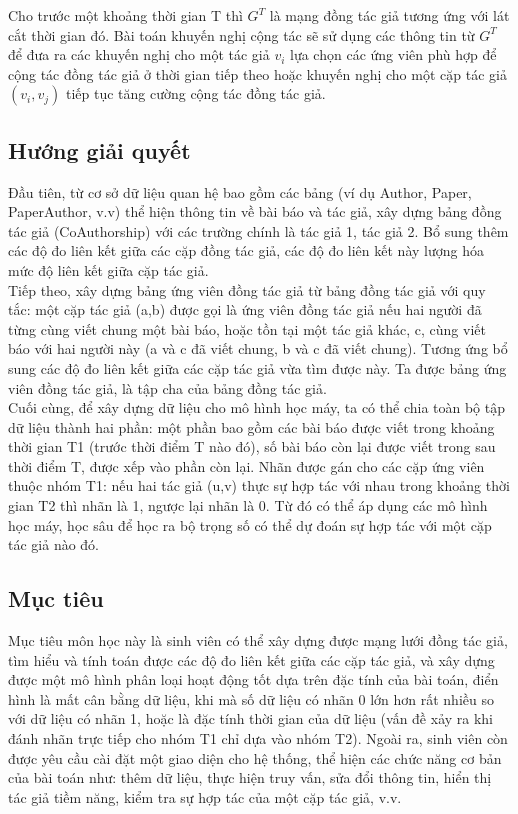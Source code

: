 \documentclass{article}
\begin{document}
Cho trước một khoảng thời gian T thì $G^T$ là mạng đồng tác giả tương ứng với lát cắt thời gian đó. Bài toán khuyến nghị cộng tác sẽ sử dụng các thông tin từ $G^T$ để đưa ra các khuyến nghị cho một tác giả $v_i$ lựa chọn các ứng viên phù hợp để cộng tác đồng tác giả ở thời gian tiếp theo hoặc khuyến nghị cho một cặp tác giả $(v_i, v_j)$ tiếp tục tăng cường cộng tác đồng tác giả.

\subsection{Hướng giải quyết}

Đầu tiên, từ cơ sở dữ liệu quan hệ bao gồm các bảng (ví dụ Author, Paper, PaperAuthor, v.v) thể hiện thông tin về bài báo và tác giả, xây dựng bảng đồng tác giả (CoAuthorship) với các trường chính là tác giả 1, tác giả 2. Bổ sung thêm các độ đo liên kết giữa các cặp đồng tác giả, các độ đo liên kết này lượng hóa mức độ liên kết giữa cặp tác giả. \\

Tiếp theo, xây dựng bảng ứng viên đồng tác giả từ bảng đồng tác giả với quy tắc: một cặp tác giả (a,b) được gọi là ứng viên đồng tác giả nếu hai người đã từng cùng viết chung một bài báo, hoặc tồn tại một tác giả khác, c, cùng viết báo với hai người này (a và c đã viết chung, b và c đã viết chung). Tương ứng bổ sung các độ đo liên kết giữa các cặp tác giả vừa tìm được này. Ta được bảng ứng viên đồng tác giả, là tập cha của bảng đồng tác giả. \\

Cuối cùng, để xây dựng dữ liệu cho mô hình học máy, ta có thể chia toàn bộ tập dữ liệu thành hai phần: một phần bao gồm các bài báo được viết trong khoảng thời gian T1 (trước thời điểm T nào đó), số bài báo còn lại được viết trong sau thời điểm T, được xếp vào phần còn lại. Nhãn được gán cho các cặp ứng viên thuộc nhóm T1: nếu hai tác giả (u,v) thực sự hợp tác với nhau trong khoảng thời gian T2 thì nhãn là 1, ngược lại nhãn là 0. Từ đó có thể áp dụng các mô hình học máy, học sâu để học ra bộ trọng số có thể dự đoán sự hợp tác với một cặp tác giả nào đó. 
 
\subsection{Mục tiêu}

Mục tiêu môn học này là sinh viên có thể xây dựng được mạng lưới đồng tác giả, tìm hiểu và tính toán được các độ đo liên kết giữa các cặp tác giả, và xây dựng được một mô hình phân loại hoạt động tốt dựa trên đặc tính của bài toán, điển hình là mất cân bằng dữ liệu, khi mà số dữ liệu có nhãn 0 lớn hơn rất nhiều so với dữ liệu có nhãn 1, hoặc là đặc tính thời gian của dữ liệu (vấn đề xảy ra khi đánh nhãn trực tiếp cho nhóm T1 chỉ dựa vào nhóm T2). Ngoài ra, sinh viên còn được yêu cầu cài đặt một giao diện cho hệ thống, thể hiện các chức năng cơ bản của bài toán như: thêm dữ liệu, thực hiện truy vấn, sửa đổi thông tin, hiển thị tác giả tiềm năng, kiểm tra sự hợp tác của một cặp tác giả, v.v. 
\end{document}
